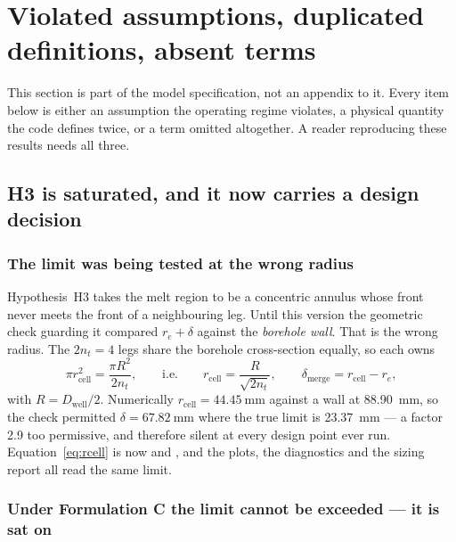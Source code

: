 \section{Violated assumptions, duplicated definitions, absent terms}
\label{sec:defects}

This section is part of the model specification, not an appendix to it. Every
item below is either an assumption the operating regime violates, a physical
quantity the code defines twice, or a term omitted altogether. A reader
reproducing these results needs all three.

\subsection{H3 is saturated, and it now carries a design decision}
\label{sec:defects:h3}

\subsubsection*{The limit was being tested at the wrong radius}

Hypothesis~H3 takes the melt region to be a concentric annulus whose front never
meets the front of a neighbouring leg. Until this version the geometric check
guarding it compared $r_{e}+\delta$ against the \emph{borehole wall}. That is
the wrong radius. The $2n_{t}=4$ legs share the borehole cross-section equally,
so each owns
\begin{equation}
  \pi r_{\mathrm{cell}}^{2} = \frac{\pi R^{2}}{2n_{t}},
  \qquad\text{i.e.}\qquad
  r_{\mathrm{cell}} = \frac{R}{\sqrt{2n_{t}}},
  \qquad
  \delta_{\mathrm{merge}} = r_{\mathrm{cell}} - r_{e},
  \label{eq:rcell}
\end{equation}
with $R=D_{\mathrm{well}}/2$. Numerically $r_{\mathrm{cell}}=\SI{44.45}{\milli\meter}$
against a wall at \SI{88.90}{\milli\meter}, so the check permitted
$\delta=\SI{67.82}{\milli\meter}$ where the true limit is
\SI{23.37}{\milli\meter} --- a factor \num{2.9} too permissive, and therefore
silent at every design point ever run. Equation~\eqref{eq:rcell} is now
 and , and the plots, the diagnostics
and the sizing report all read the same limit.

\subsubsection*{Under Formulation C the limit cannot be exceeded --- it is sat on}

